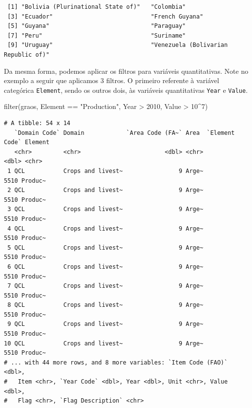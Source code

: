 \documentclass[
  brazilian,
]{book}
\newenvironment{Shaded}{\begin{snugshade}}{\end{snugshade}}
\newcommand{\DecValTok}[1]{\textcolor[rgb]{0.00,0.00,0.81}{#1}}
\newcommand{\FunctionTok}[1]{\textcolor[rgb]{0.00,0.00,0.00}{#1}}
\newcommand{\NormalTok}[1]{#1}
\newcommand{\SpecialCharTok}[1]{\textcolor[rgb]{0.00,0.00,0.00}{#1}}
\newcommand{\StringTok}[1]{\textcolor[rgb]{0.31,0.60,0.02}{#1}}
\begin{document}
\begin{verbatim}
 [1] "Bolivia (Plurinational State of)"   "Colombia"                          
 [3] "Ecuador"                            "French Guyana"                     
 [5] "Guyana"                             "Paraguay"                          
 [7] "Peru"                               "Suriname"                          
 [9] "Uruguay"                            "Venezuela (Bolivarian Republic of)"
\end{verbatim}

Da mesma forma, podemos aplicar os filtros para variáveis quantitativas. Note no exemplo a seguir que aplicamos 3 filtros. O primeiro referente à variável categórica \texttt{Element}, sendo os outros dois, às variáveis quantitativas \texttt{Year} e \texttt{Value}.

\begin{Shaded}
\begin{Highlighting}[]
\FunctionTok{filter}\NormalTok{(graos,}
\NormalTok{       Element }\SpecialCharTok{==} \StringTok{"Production"}\NormalTok{,}
\NormalTok{       Year }\SpecialCharTok{\textgreater{}} \DecValTok{2010}\NormalTok{,}
\NormalTok{       Value }\SpecialCharTok{\textgreater{}} \DecValTok{10}\SpecialCharTok{\^{}}\DecValTok{7}\NormalTok{)}
\end{Highlighting}
\end{Shaded}

\begin{verbatim}
# A tibble: 54 x 14
   `Domain Code` Domain            `Area Code (FA~` Area  `Element Code` Element
   <chr>         <chr>                        <dbl> <chr>          <dbl> <chr>  
 1 QCL           Crops and livest~                9 Arge~           5510 Produc~
 2 QCL           Crops and livest~                9 Arge~           5510 Produc~
 3 QCL           Crops and livest~                9 Arge~           5510 Produc~
 4 QCL           Crops and livest~                9 Arge~           5510 Produc~
 5 QCL           Crops and livest~                9 Arge~           5510 Produc~
 6 QCL           Crops and livest~                9 Arge~           5510 Produc~
 7 QCL           Crops and livest~                9 Arge~           5510 Produc~
 8 QCL           Crops and livest~                9 Arge~           5510 Produc~
 9 QCL           Crops and livest~                9 Arge~           5510 Produc~
10 QCL           Crops and livest~                9 Arge~           5510 Produc~
# ... with 44 more rows, and 8 more variables: `Item Code (FAO)` <dbl>,
#   Item <chr>, `Year Code` <dbl>, Year <dbl>, Unit <chr>, Value <dbl>,
#   Flag <chr>, `Flag Description` <chr>
\end{verbatim}
\end{document}
